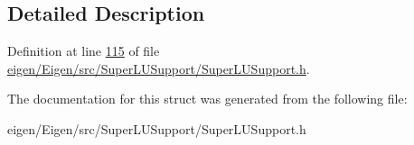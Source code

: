\subsection{Detailed Description}


Definition at line \hyperlink{eigen_2_eigen_2src_2_super_l_u_support_2_super_l_u_support_8h_source_l00115}{115} of file \hyperlink{eigen_2_eigen_2src_2_super_l_u_support_2_super_l_u_support_8h_source}{eigen/\+Eigen/src/\+Super\+L\+U\+Support/\+Super\+L\+U\+Support.\+h}.



The documentation for this struct was generated from the following file\+:\begin{DoxyCompactItemize}
\item 
eigen/\+Eigen/src/\+Super\+L\+U\+Support/\+Super\+L\+U\+Support.\+h\end{DoxyCompactItemize}
